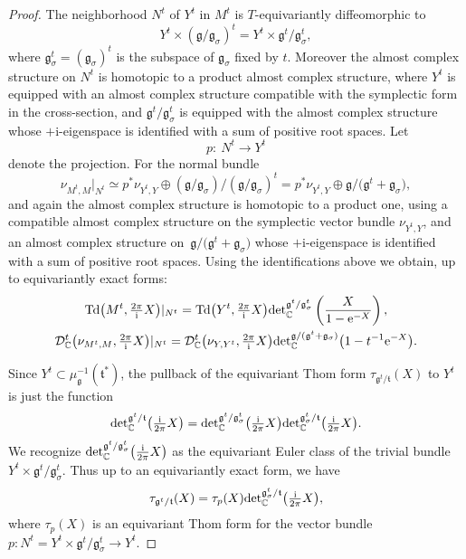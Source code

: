 \documentclass[11pt]{article}
\numberwithin{equation}{section}
\newcommand{\tn}[1]{\textnormal{#1}}
\renewcommand{\i}{{\mathrm{i}}}
\def\g{\ensuremath{\mathfrak{g}}}
\def\t{\ensuremath{\mathfrak{t}}}
\def\bC{\ensuremath{\mathbb{C}}}
\def\Td{\ensuremath{\textnormal{Td}}}
\def\calDC{\ensuremath{\mathcal{D}_{\bC}}}
\def\de{\ensuremath{\tn{det}_\bC}}
\begin{document}
\begin{proof}The neighborhood $N^t$ of $Y^t$ in $M^t$ is $T$-equivariantly diffeomorphic to
\[ Y^t \times (\g/\g_\sigma)^t=Y^t\times \g^t/\g_\sigma^t,\]
where $\g_\sigma^t=(\g_\sigma)^t$ is the subspace of $\g_\sigma$ fixed by $t$. Moreover the almost complex structure on $N^t$ is homotopic to a product almost complex structure, where $Y^t$ is equipped with an almost complex structure compatible with the symplectic form in the cross-section, and $\g^t/\g_\sigma^t$ is equipped with the almost complex structure whose $+\i$-eigenspace is identified with a sum of positive root spaces. Let
\[ p\colon \ N^t \rightarrow Y^t \]
denote the projection. For the normal bundle
\[ \nu_{M^t,M}|_{N^t} \simeq p^\ast \nu_{Y^t,Y}\oplus (\g/\g_\sigma)/(\g/\g_\sigma)^t=p^\ast \nu_{Y^t,Y}\oplus\g/\big(\g^t+\g_\sigma\big),\]
and again the almost complex structure is homotopic to a product one, using a compatible almost complex structure on the symplectic vector bundle $\nu_{Y^t,Y}$, and an almost complex structure on~$\g/\big(\g^t+\g_\sigma\big)$ whose $+\i$-eigenspace is identified with a sum of positive root spaces. Using the identifications above we obtain, up to equivariantly exact forms:
\begin{gather}\label{eqn:dec}
\Td\big(M^t,\tfrac{2\pi}{\i}X\big)|_{N^t} =\Td\big(Y^t,\tfrac{2\pi}{\i}X\big)\tn{det}_{\bC}^{\g^t/\g_\sigma^t}\left(\frac{X}{1-{\rm e}^{-X}}\right),\\ \nonumber
\calDC^t\big(\nu_{M^t,M},\tfrac{2\pi}{\i}X\big)|_{N^t} =\calDC^t\big(\nu_{Y,Y^t},\tfrac{2\pi}{\i}X\big)\tn{det}_{\bC}^{\g/(\g^t+\g_\sigma)}\big(1-t^{-1}{\rm e}^{-X}\big).
\end{gather}

Since $Y^t \subset \mu_\g^{-1}(\t^\ast)$, the pullback of the equivariant Thom form $\tau_{\g^t/\t}(X)$ to $Y^t$ is just the function
\[ \de^{\g^t/\t}\big(\tfrac{\i}{2\pi}X\big)=\de^{\g^t/\g_\sigma^t}\big(\tfrac{\i}{2\pi}X\big)\de^{\g_\sigma^t/\t}\big(\tfrac{\i}{2\pi}X\big).\]
We recognize $\de^{\g^t/\g_\sigma^t}\big(\tfrac{\i}{2\pi}X\big)$ as the equivariant Euler class of the trivial bundle $Y^t \times \g^t/\g_\sigma^t$. Thus up to an equivariantly exact form, we have{\samepage
\begin{gather}\label{eqn:dec2}
\tau_{\g^t/\t}(X)=\tau_p(X)\de^{\g_\sigma^t/\t}\big(\tfrac{\i}{2\pi}X\big),
\end{gather}
where $\tau_p(X)$ is an equivariant Thom form for the vector bundle $p\colon N^t=Y^t\times \g^t/\g_\sigma^t\rightarrow Y^t$.}


\end{proof}
\end{document}
